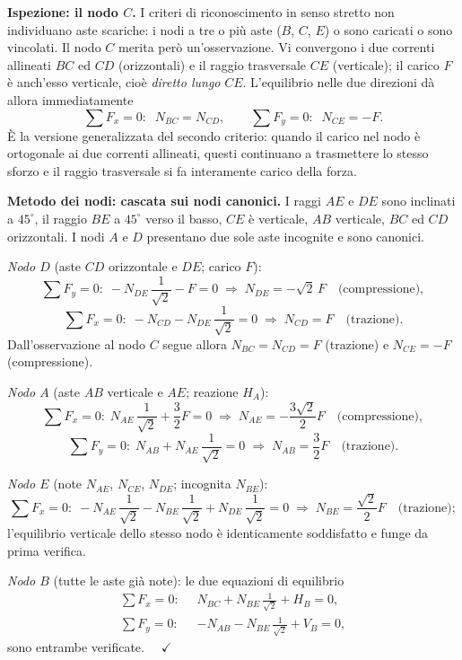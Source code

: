 \begin{esercizio}
\begin{svolgimento}
		\noindent\textbf{Ispezione: il nodo $C$.}
		I criteri di riconoscimento in senso stretto non
		individuano aste scariche: i nodi a tre o più aste
		($B$, $C$, $E$) o sono caricati o sono vincolati.
		Il nodo $C$ merita però un'osservazione. Vi
		convergono i due correnti allineati $BC$ ed $CD$
		(orizzontali) e il raggio trasversale $CE$
		(verticale); il carico $F$ è anch'esso verticale,
		cioè \emph{diretto lungo} $CE$. L'equilibrio nelle
		due direzioni dà allora immediatamente
		\[
		\sum F_x = 0:\;\; N_{BC} = N_{CD},
		\qquad
		\sum F_y = 0:\;\; N_{CE} = -F .
		\]
		È la versione generalizzata del secondo criterio:
		quando il carico nel nodo è ortogonale ai due
		correnti allineati, questi continuano a trasmettere
		lo stesso sforzo e il raggio trasversale si fa
		interamente carico della forza.
		
		\noindent\textbf{Metodo dei nodi: cascata sui nodi
			canonici.}
		I raggi $AE$ e $DE$ sono inclinati a $45^\circ$, il
		raggio $BE$ a $45^\circ$ verso il basso, $CE$ è
		verticale, $AB$ verticale, $BC$ ed $CD$ orizzontali.
		I nodi $A$ e $D$ presentano due sole aste incognite
		e sono canonici.
		
		\smallskip
		\textit{Nodo $D$} (aste $CD$ orizzontale e $DE$;
		carico $F$):
		\[
		\sum F_y = 0:\;
		-N_{DE}\,\frac{1}{\sqrt2} - F = 0
		\;\Rightarrow\;
		N_{DE} = -\sqrt2\,F
		\quad\text{(compressione)},
		\]
		\[
		\sum F_x = 0:\;
		-N_{CD} - N_{DE}\,\frac{1}{\sqrt2} = 0
		\;\Rightarrow\;
		N_{CD} = F
		\quad\text{(trazione)}.
		\]
		Dall'osservazione al nodo $C$ segue allora
		$N_{BC} = N_{CD} = F$ (trazione) e $N_{CE} = -F$
		(compressione).
		
		\smallskip
		\textit{Nodo $A$} (aste $AB$ verticale e $AE$;
		reazione $H_A$):
		\[
		\sum F_x = 0:\;
		N_{AE}\,\frac{1}{\sqrt2} + \frac{3}{2}F = 0
		\;\Rightarrow\;
		N_{AE} = -\frac{3\sqrt2}{2}F
		\quad\text{(compressione)},
		\]
		\[
		\sum F_y = 0:\;
		N_{AB} + N_{AE}\,\frac{1}{\sqrt2} = 0
		\;\Rightarrow\;
		N_{AB} = \frac{3}{2}F
		\quad\text{(trazione)}.
		\]
		
		\smallskip
		\textit{Nodo $E$} (note $N_{AE}$, $N_{CE}$, $N_{DE}$;
		incognita $N_{BE}$):
		\[
		\sum F_x = 0:\;
		-N_{AE}\,\frac{1}{\sqrt2} - N_{BE}\,\frac{1}{\sqrt2}
		+ N_{DE}\,\frac{1}{\sqrt2} = 0
		\;\Rightarrow\;
		N_{BE} = \frac{\sqrt2}{2}F
		\quad\text{(trazione)};
		\]
		l'equilibrio verticale dello stesso nodo è
		identicamente soddisfatto e funge da prima verifica.
		
		\smallskip
		\textit{Nodo $B$} (tutte le aste già note): le due
		equazioni di equilibrio
		\[
		\begin{aligned}
			\sum F_x = 0:\;\;
			&N_{BC} + N_{BE}\,\frac{1}{\sqrt2} + H_B = 0,\\[2pt]
			\sum F_y = 0:\;\;
			&-N_{AB} - N_{BE}\,\frac{1}{\sqrt2} + V_B = 0,
		\end{aligned}
		\]
		sono entrambe verificate. $\quad\checkmark$
		

\end{svolgimento}
\end{esercizio}
